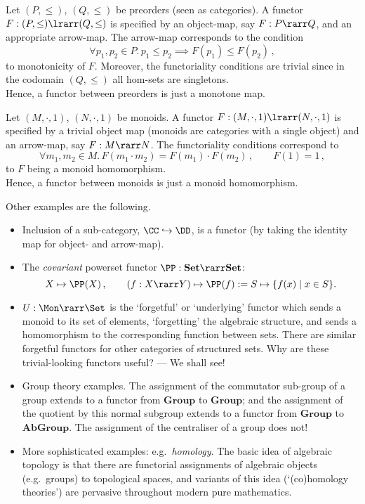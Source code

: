 \documentclass{svmult}
\begin{document}
%
\begin{myexample}
Let $(P,\leq)$, $(Q,\leq)$ be preorders (seen as categories). A functor $F:(P,\leq)\lrarr(Q,\leq)$ is specified by an object-map, say $F:P\rarr Q$, and
an appropriate arrow-map. The arrow-map corresponds to the condition
\[ \forall p_1,p_2\in P.\, p_1\leq p_2 \implies F(p_1)\leq F(p_2)\,, \]
\ie to monotonicity of $F$. Moreover, the functoriality conditions are trivial since in the codomain $(Q,\leq)$ all hom-sets are singletons.\\
Hence, a functor between preorders is just a monotone map.
\end{myexample}
\begin{myexample}
Let $(M,\cdot,1)$, $(N,\cdot,1)$ be monoids. A functor $F:(M,\cdot,1)\lrarr(N,\cdot,1)$ is specified by a trivial object map (monoids are categories
with a single object) and an arrow-map, say $F:M\rarr N$. The functoriality conditions correspond to
\[ \forall m_1,m_2\in M.\, F(m_1\cdot m_2)=F(m_1)\cdot F(m_2)\,,\qquad F(1)=1\,,\]
\ie to $F$ being a monoid homomorphism.\\
Hence, a functor between monoids is just a monoid homomorphism.
\end{myexample}
%
Other examples are the following.
\begin{itemize}
\item Inclusion of a sub-category, $\CC\hookrightarrow\DD$, is a functor (by taking the identity map for object- and arrow-map).
\item The \emph{covariant} powerset functor $\PP:\mathbf{Set} \rarr \mathbf{Set}$:
\[ X \mapsto \PP(X)\,, \qquad (f : X \rarr Y) \mapsto \PP(f) := S \mapsto \{ f(x) \mid x \in S \} . \]
%
\item $U : \Mon \rarr \Set$ is the `forgetful' or `underlying' functor which sends a monoid to its set
  of elements, `forgetting' the algebraic structure, and sends a homomorphism to the corresponding function between sets. There are
  similar forgetful functors for other categories of structured sets. Why are these trivial-looking functors useful? --- We shall see!


\item Group theory examples. The assignment of the commutator sub-group of a group extends to a functor from $\textbf{Group}$ to $\textbf{Group}$;
    and the assignment of the quotient by this normal subgroup extends to a functor from $\textbf{Group}$ to $\textbf{AbGroup}$.
    The assignment of the centraliser of a group does not!
%
\item More sophisticated examples: e.g.~\emph{homology}. The basic idea of algebraic topology is that there are functorial assignments of algebraic objects (e.g.~groups) to topological spaces, and variants of this idea (`(co)homology theories') are pervasive throughout modern pure mathematics.
\end{itemize}
\end{document}
